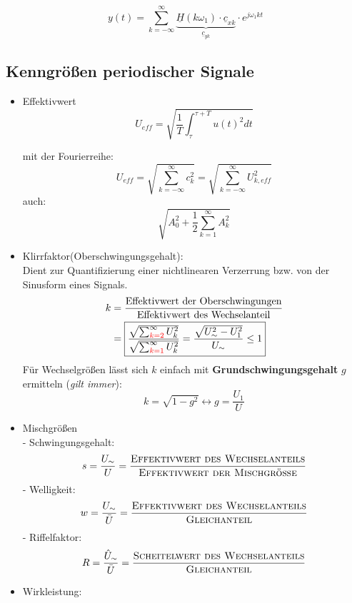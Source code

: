 \[
	y(t) = \sum_{k=-\infty}^{\infty} \underbrace{\underline{H}(k\omega_1)\cdot\underline{c}_{xk}}_{\underline{c}_{yk}} \cdot e^{j\omega_1 k t}
\]

\subsection{Kenngrößen periodischer Signale}
\begin{itemize}
	\item Effektivwert
	      \[
		      \boxed{U_{\mathit{eff}} = \sqrt{\frac{1}{T} \int_\tau^{\tau+T} u(t)^2 dt}}
	      \]
	      \begin{mdframed}[style=exercise]
		      mit der Fourierreihe:
		      $$ U_{\mathit{eff}} = \sqrt{\sum_{k=-\infty}^{\infty} c_k^2} = \sqrt{\sum_{k=-\infty}^{\infty}U_{k,\mathit{eff}}^2} $$
		      auch:
          $$ \sqrt{A_0^2 + \frac{1}{2} \sum_{k=1}^{\infty} A_k^2}$$
	      \end{mdframed}
	\item Klirrfaktor(Oberschwingungsgehalt):\\
	      Dient zur Quantifizierung einer nichtlinearen Verzerrung bzw. von der
	      Sinusform eines Signals.
	      \begin{align*}
		      k & = \frac{\text{Effektivwert der Oberschwingungen}}{\text{Effektivwert des Wechselanteil}}                                                                                  \\
		        & = \boxed{\frac{\sqrt{\sum_{{\color{red}{k=2}}}^{\infty} U_{k}^{2}}}{\sqrt{\sum_{{\color{red}{k=1}}}^{\infty} U_{k}^{2}}} = \frac{\sqrt{U_\sim^2 - U_1^2}}{U_\sim} \leq 1}
	      \end{align*}
	      Für Wechselgrößen lässt sich $k$ einfach mit \textbf{Grundschwingungsgehalt} $g$ ermitteln (\textit{gilt immer}):
	      \[
		      \boxed{k = \sqrt{1-g^2} \leftrightarrow g = \frac{U_1}{U}}
	      \]
	\item Mischgrößen\\
	      - Schwingungsgehalt:
	      \[
		      s = \frac{U_\sim}{U} = \frac{\textsc{Effektivwert des Wechselanteils}}{\textsc{Effektivwert der Mischgröße}}
	      \]
	      - Welligkeit:
	      \[
		      w = \frac{U_\sim}{\bar{U}} = \frac{\textsc{Effektivwert des Wechselanteils}}{\textsc{Gleichanteil}}
	      \]
	      - Riffelfaktor:
	      \[
		      R = \frac{\hat{U}_\sim}{\bar{U}} = \frac{\textsc{Scheitelwert des Wechselanteils}}{\textsc{Gleichanteil}}
	      \]
	\item Wirkleistung:
	      \[
\]
\end{itemize}
